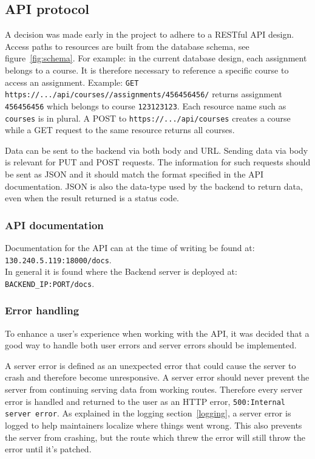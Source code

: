 \subsection{API protocol}
A decision was made early in the project to adhere to a RESTful API design. Access paths to resources are built from the database schema, see figure~\ref{fig:schema}. For example: in the current database design, each assignment belongs to a course. It is therefore necessary to reference a specific course to access an assignment. Example: \texttt{GET https://.../api/courses//assignments/456456456/} returns assignment \texttt{456456456} which belongs to course \texttt{123123123}. Each resource name such as \texttt{courses} is in plural. A POST to \texttt{https://.../api/courses} creates a course while a GET request to the same resource returns all courses.

Data can be sent to the backend via both body and URL. Sending data via body is relevant for PUT and POST requests. The information for such requests should be sent as JSON and it should match the format specified in the API documentation. JSON is also the data-type used by the backend to return data, even when the result returned is a status code.

\subsubsection{API documentation} \label{apidocs}
Documentation for the API can at the time of writing be found at: \\ \texttt{130.240.5.119:18000/docs}. \\
In general it is found where the Backend server is deployed at: \\ \texttt{BACKEND\_IP:PORT/docs}.

\subsubsection{Error handling}
To enhance a user's experience when working with the API, it was decided that a good way to handle both user errors and server errors should be implemented.

A server error is defined as an unexpected error that could cause the server to crash and therefore become unresponsive. A server error should never prevent the server from continuing serving data from working routes. Therefore every server error is handled and returned to the user as an HTTP error, \texttt{500:\@ Internal server error}. As explained in the logging section~\ref{logging}, a server error is logged to help maintainers localize where things went wrong. This also prevents the server from crashing, but the route which threw the error will still throw the error until it's patched.

